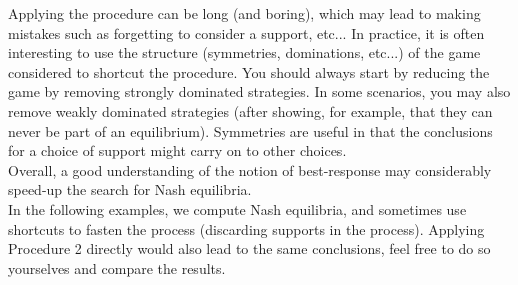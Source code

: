 Applying the procedure can be long (and boring), which may lead to making mistakes such as forgetting to consider a support, etc... In practice, it is often interesting to use the structure (symmetries, dominations, etc...) of the game considered to shortcut the procedure.
You should always start by reducing the game by removing strongly dominated strategies. In some scenarios, you may also remove weakly dominated strategies (after showing, for example, that they can never be part of an equilibrium). Symmetries are useful in that the conclusions for a choice of support might carry on to other choices.\\
Overall, a good understanding of the notion of best-response may considerably speed-up the search for Nash equilibria.\\
In the following examples, we compute Nash equilibria, and sometimes use shortcuts to fasten the process (discarding supports in the process). Applying Procedure 2 directly would also lead to the same conclusions, feel free to do so yourselves and compare the results.
